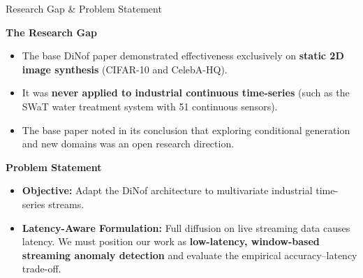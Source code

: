 \documentclass[aspectratio=169, 11pt]{beamer}
\begin{document}
\begin{frame}{Research Gap \& Problem Statement}

  \textbf{\large The Research Gap}
  \begin{itemize}\itemsep=5pt
    \item The base DiNof paper demonstrated effectiveness exclusively on \textbf{static 2D image synthesis} (CIFAR-10 and CelebA-HQ).
    \item It was \textbf{never applied to industrial continuous time-series} (such as the SWaT water treatment system with 51 continuous sensors).
    \item The base paper noted in its conclusion that exploring conditional generation and new domains was an open research direction.
  \end{itemize}

  \vspace{8pt}
  \textbf{\large Problem Statement}
  \begin{itemize}\itemsep=5pt
    \item \textbf{Objective:} Adapt the DiNof architecture to multivariate industrial time-series streams.
    \item \textbf{Latency-Aware Formulation:} Full diffusion on live streaming data causes latency. We must position our work as \textbf{low-latency, window-based streaming anomaly detection} and evaluate the empirical accuracy--latency trade-off.
  \end{itemize}

\end{frame}
\end{document}
